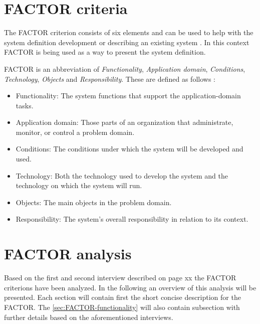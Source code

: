 \section{FACTOR criteria}
The FACTOR criterion consists of six elements and can be used to help with the system definition development or describing an existing system
. 
In this context FACTOR is being used as a way to present the system definition.

FACTOR is an abbreviation of \textit{Functionality}, \textit{Application domain}, \textit{Conditions}, \textit{Technology}, \textit{Objects} and \textit{Responsibility}.
These are defined as follows \citep[p.~40]{Rod-Aalborg}:
\begin{itemize}
	\item
	 Functionality: 
	 The system functions that support the application-domain tasks.
	\item
	 Application domain: 
	 Those parts of an organization that administrate, monitor, or control a problem domain.
	\item
	 Conditions: 
	 The conditions under which the system will be developed and used.
	\item
	 Technology: 
	 Both the technology used to develop the system and the technology on which the system will run.
	\item
	 Objects: 
	 The main objects in the problem domain.
	\item
	 Responsibility: 
	 The system’s overall responsibility in relation to its context.
\end{itemize}

\section{FACTOR analysis}
Based on the first and second interview described on page xx the FACTOR criterions have been analyzed. 
In the following an overview of this analysis will be presented.
Each section will contain first the short concise description for the FACTOR. 
The \cref{sec:FACTOR-functionality} will also contain subsection with further details based on the aforementioned interviews. 
